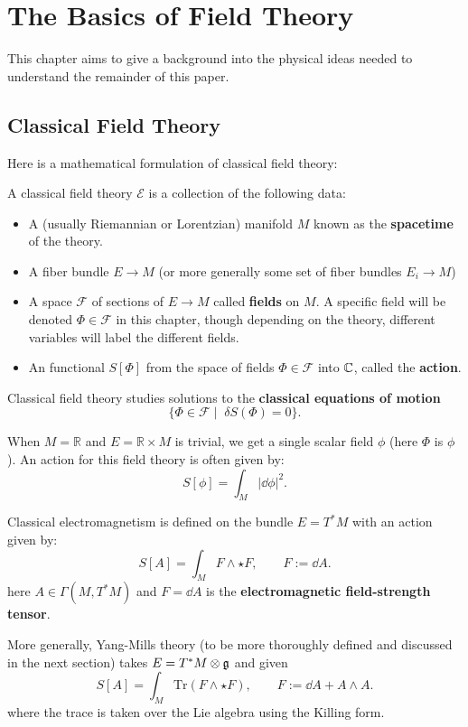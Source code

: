 \chapter{The Basics of Field Theory\label{ch:phys}}

	This chapter aims to give a background into the physical ideas needed to understand the remainder of this paper.
	
	\section{Classical Field Theory} %
	\label{sec:classical_field_theory}
	
	
	
	Here is a mathematical formulation of classical field theory:
	\begin{phys}
		A classical field theory $\mathcal E$ is a collection of the following data:
		\begin{itemize}
			\item A (usually Riemannian or Lorentzian) manifold $M$ known as the \textbf{spacetime} of the theory.
			\item A fiber bundle $E \to M$ (or more generally some set of fiber bundles $E_i \to M$)
			\item A space $\mathcal F$ of sections of $E \to M$ called \textbf{fields} on $M$. A specific field will be denoted $\Phi \in \mathcal F$ in this chapter, though depending on the theory, different variables will label the different fields.
			\item An functional $S[\Phi]$ from the space of fields $\Phi \in \mathcal F$ into $\mathbb{C}$, called the \textbf{action}.
		\end{itemize}
		Classical field theory studies solutions to the \textbf{classical equations of motion}
		$$\{\Phi \in \mathcal F \mid \; \delta S(\Phi) = 0 \}.$$
	\end{phys}
	\begin{eg}
		When $M = \mathbb R$ and $E = \mathbb R \times M$ is trivial, we get a single scalar field $\phi$ (here $\Phi$ is $\phi$). An action for this field theory is often given by:
		$$S[\phi] = \int_M |\dd \phi|^2.$$
	\end{eg}
	\begin{eg}
		Classical electromagnetism is defined on the bundle $E = T^* M$ with an action given by:
		$$S[A] = \int_M F \wedge \star F, \qquad F := \dd A.$$
		here $A\in \Gamma(M, T^*M)$ and $F = \dd A$ is the \textbf{electromagnetic field-strength tensor}.
		
		More generally, Yang-Mills theory (to be more thoroughly defined and discussed in the next section) takes $E=T^* M \otimes \frak g$ and given 
		$$S[A] = \int_M \mathrm{Tr}\left( F \wedge \star F \right), \qquad F := \dd A + A \wedge A.$$
		where the trace is taken over the Lie algebra using the Killing form. 
	\end{eg}
	
